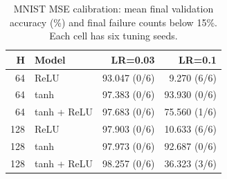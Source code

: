 \begin{table}[htbp]
\centering
\caption{MNIST MSE calibration: mean final validation accuracy (\%) and final failure counts below 15\%. Each cell has six tuning seeds.}
\label{tab:msestability}
\small
\begin{tabular}{@{}rlrr@{}}
\toprule
H & Model & LR=0.03 & LR=0.1 \\
\midrule
64 & ReLU & 93.047 (0/6) & 9.270 (6/6) \\
64 & tanh & 97.383 (0/6) & 93.930 (0/6) \\
64 & tanh + ReLU & 97.683 (0/6) & 75.560 (1/6) \\
128 & ReLU & 97.903 (0/6) & 10.633 (6/6) \\
128 & tanh & 97.973 (0/6) & 92.687 (0/6) \\
128 & tanh + ReLU & 98.257 (0/6) & 36.323 (3/6) \\
\bottomrule
\end{tabular}
\par{}
\end{table}
